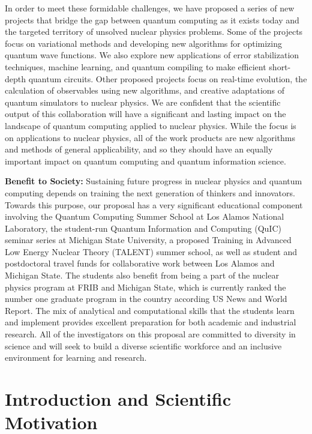 \documentclass[11pt]{article}
\begin{document}
In order to meet these formidable challenges, we have proposed a series of new projects that bridge the gap between quantum computing as it exists today and the targeted territory of unsolved nuclear physics problems.  Some of the projects focus on variational methods and developing new algorithms for optimizing quantum wave functions.  We also explore new applications of error stabilization techniques, machine learning, and quantum compiling to make efficient short-depth quantum circuits. Other proposed projects focus on real-time evolution, the calculation of observables using new algorithms, and creative adaptations of quantum simulators to nuclear physics.  We are confident that the scientific output of this collaboration will have a significant and lasting impact on the landscape of quantum computing applied to nuclear physics.  While the focus is on applications to nuclear physics, all of the work products are new algorithms and methods of general applicability, and so they should have an equally important impact on quantum computing and quantum information science.

{\bf Benefit to Society:}  Sustaining future progress in nuclear physics and quantum computing depends on training the next generation of thinkers and innovators.  Towards this purpose, our proposal has a very significant educational component involving the Quantum Computing Summer School at Los Alamos National Laboratory, the student-run Quantum Information and Computing (QuIC) seminar series at Michigan State University, a proposed Training in Advanced Low Energy Nuclear Theory (TALENT) summer school, as well as student and postdoctoral travel funds for collaborative work between Los Alamos and Michigan State.  The students also benefit from being a part of the nuclear physics program at FRIB and Michigan State, which is currently ranked the number one graduate program in the country according US News and World Report. The mix of analytical and computational skills that the students learn and implement provides excellent preparation for both academic and industrial research. All of the investigators on this proposal are committed to diversity in science and will seek to build a diverse scientific workforce and an inclusive environment for learning and research. 
\clearpage

\section{Introduction and Scientific Motivation}
\pagestyle{plain}
\setcounter{page}{1}
\end{document}
